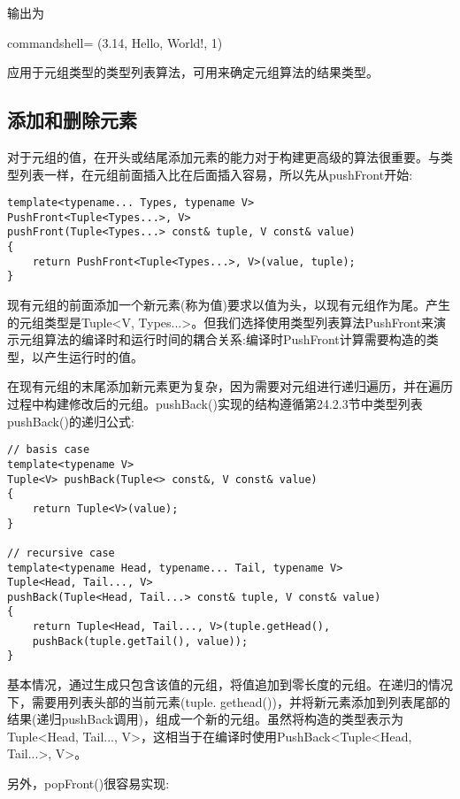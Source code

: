 输出为

\begin{tcblisting}{commandshell={}}
(3.14, Hello, World!, 1)
\end{tcblisting}

应用于元组类型的类型列表算法，可用来确定元组算法的结果类型。

\subsection{添加和删除元素}

对于元组的值，在开头或结尾添加元素的能力对于构建更高级的算法很重要。与类型列表一样，在元组前面插入比在后面插入容易，所以先从pushFront开始:

\begin{lstlisting}[style=styleCXX]
template<typename... Types, typename V>
PushFront<Tuple<Types...>, V>
pushFront(Tuple<Types...> const& tuple, V const& value)
{
	return PushFront<Tuple<Types...>, V>(value, tuple);
}
\end{lstlisting}

现有元组的前面添加一个新元素(称为值)要求以值为头，以现有元组作为尾。产生的元组类型是Tuple<V, Types...>。但我们选择使用类型列表算法PushFront来演示元组算法的编译时和运行时间的耦合关系:编译时PushFront计算需要构造的类型，以产生运行时的值。

在现有元组的末尾添加新元素更为复杂，因为需要对元组进行递归遍历，并在遍历过程中构建修改后的元组。pushBack()实现的结构遵循第24.2.3节中类型列表pushBack()的递归公式:

\begin{lstlisting}[style=styleCXX]
// basis case
template<typename V>
Tuple<V> pushBack(Tuple<> const&, V const& value)
{
	return Tuple<V>(value);
}

// recursive case
template<typename Head, typename... Tail, typename V>
Tuple<Head, Tail..., V>
pushBack(Tuple<Head, Tail...> const& tuple, V const& value)
{
	return Tuple<Head, Tail..., V>(tuple.getHead(),
	pushBack(tuple.getTail(), value));
}
\end{lstlisting}

基本情况，通过生成只包含该值的元组，将值追加到零长度的元组。在递归的情况下，需要用列表头部的当前元素(tuple. gethead())，并将新元素添加到列表尾部的结果(递归pushBack调用)，组成一个新的元组。虽然将构造的类型表示为Tuple<Head, Tail..., V>，这相当于在编译时使用PushBack<Tuple<Head, Tail...>, V>。

另外，popFront()很容易实现:

